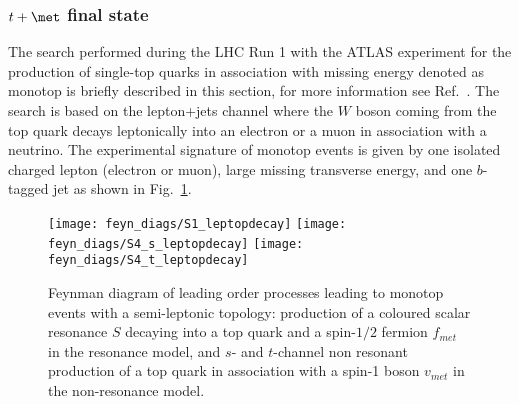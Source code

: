 \subsubsection{$t+\met$ final state}
\label{sec:monotop}
 
The search performed during the LHC Run 1 with the ATLAS experiment for the production of 
single-top quarks in association with missing energy denoted as monotop is briefly described in this section,
for more information see Ref.~\cite{ATLASmonotop}. 
The search is based on the lepton+jets channel where the $W$ boson coming from the top quark decays leptonically 
into an electron or a muon in association with a neutrino.
The experimental signature of monotop events is given by one isolated charged lepton (electron or muon),
large missing transverse energy, and one $b$-tagged jet as shown in Fig.~\ref{fig:feyn_prod_lepdecay}.

\begin{figure}[!h!tpd]
\centering
\texttt{[image: feyn\_diags/S1\_leptopdecay]}
\texttt{[image: feyn\_diags/S4\_s\_leptopdecay]}
\texttt{[image: feyn\_diags/S4\_t\_leptopdecay]}
\caption
{
Feynman diagram of leading order processes leading to monotop events with a semi-leptonic topology: production of
a coloured scalar resonance $S$ decaying into a top quark and a spin-$1/2$ fermion $f_{met}$
in the resonance model, and $s$- and $t$-channel non resonant production of a top quark in association with
a spin-1 boson $v_{met}$ in the non-resonance model.
}
\label{fig:feyn_prod_lepdecay}
\end{figure}

